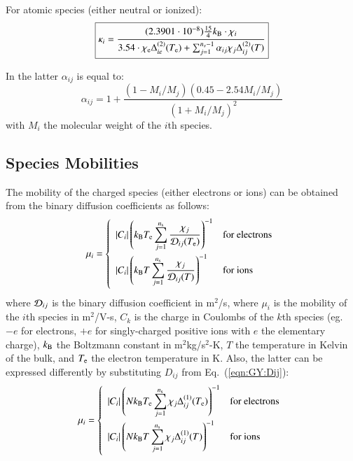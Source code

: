 \documentclass{warpdoc}
\newcommand{\alb}{\vspace{0.1cm}\\} %
\newcommand{\mfd}{\displaystyle}
\newcommand\frameeqn[1]{\fbox{$\displaystyle #1$}}
\begin{document}
For atomic species (either neutral or ionized):
%
\begin{equation}
\frameeqn{
\kappa_i = \frac{(2.3901\cdot10^{-8}) \frac{15}{4} k_{\rm B}  \cdot \chi_i}{3.54\cdot \chi_{\rm e} \Delta_{ie}^{(2)}(T_{\rm e})+ \sum_{j=1}^{n_s-1} \alpha_{ij} \chi_j \Delta_{ij}^{(2)}(T) }
}
\end{equation}
%

In the latter $\alpha_{ij}$ is equal to:
%
\begin{equation}
\alpha_{ij}=1+ \frac{(1- M_i/M_j)(0.45-2.54 M_i / M_j)}{(1+ M_i/M_j)^2}
\end{equation}
%
with $M_i$ the molecular weight of the $i$th species.


\subsection{Species Mobilities}

The mobility of the charged species (either electrons or ions) can be obtained from the binary diffusion coefficients as follows:
%
\begin{equation}
 \mu_i= \left\{\begin{array}{ll}
   \mfd  |C_i| \left( k_{\rm B} T_{\rm e} \sum_{j=1}^{n_{\rm s}} \frac{\chi_j}{{\cal D}_{ij}(T_{\rm e})}\right)^{-1} & \textrm{for electrons} \alb
    \mfd  |C_i| \left( k_{\rm B} T \sum_{j=1}^{n_{\rm s}} \frac{\chi_j}{{\cal D}_{ij}(T)}\right)^{-1} & \textrm{for ions} \alb
 \end{array} \right.
\end{equation}
%
where ${\cal D}_{ij}$ is the binary diffusion coefficient in m$^2$/s, where $\mu_i$ is the mobility of the $i$th species in m$^2$/V-s, $C_k$ is the charge in Coulombs of the $k$th species (eg.\ $-e$ for electrons, $+e$ for singly-charged positive ions with $e$ the elementary charge), $k_{\rm B}$ the Boltzmann constant in m$^2$kg/s$^2$-K, $T$ the temperature in Kelvin of the bulk, and $T_{\rm e}$ the electron temperature in K.
Also, the latter can be expressed differently by substituting $D_{ij}$ from Eq.\ (\ref{eqn:GY:Dij}):
%
\begin{equation}
 \mu_i= \left\{\begin{array}{ll}
   \mfd  |C_i| \left( N k_{\rm B} T_{\rm e} \sum_{j=1}^{n_{\rm s}} \chi_j  \Delta_{ij}^{(1)}(T_{\rm e}) \right)^{-1} & \textrm{for electrons} \alb
    \mfd  |C_i| \left( N k_{\rm B} T \sum_{j=1}^{n_{\rm s}} \chi_j  \Delta_{ij}^{(1)}(T) \right)^{-1} & \textrm{for ions} \alb
 \end{array} \right.
\end{equation}
%
\end{document}
